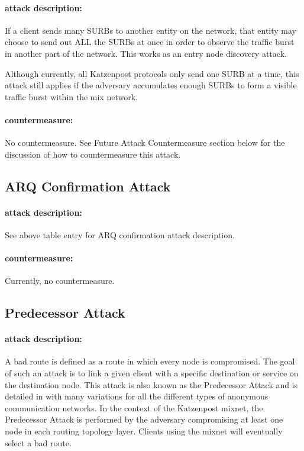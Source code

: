 \documentclass{article}
\begin{document}
\paragraph{attack description:} If a client sends many SURBs to another entity on the network,
that entity may choose to send out ALL the SURBs at once in order to observe the traffic burst
in another part of the network. This works as an entry node discovery attack. 

Although currently, all Katzenpost protocols only send one SURB at a time, this attack still
applies if the adversary accumulates enough SURBs to form a visible traffic burst within the mix
network.

\paragraph{countermeasure:} No countermeasure. See Future Attack Countermeasure section below for the discussion of how to countermeasure this attack.

\subsection{ARQ Confirmation Attack}

\paragraph{attack description:} See above table entry for ARQ confirmation attack description.

\paragraph{countermeasure:} Currently, no countermeasure.

\subsection{Predecessor Attack}

\paragraph{attack description:} A bad route is defined as a route in which every node is compromised. The goal of such an attack is to link a given client with a specific destination or service on the destination node. This attack is also known as the Predecessor Attack and is detailed in  with many variations for all the different types of anonymous communication networks. In the context of the Katzenpost mixnet, the Predecessor Attack is performed by the adversary compromising at least one node in each routing topology layer. Clients using the mixnet will eventually select a bad route.
\end{document}
